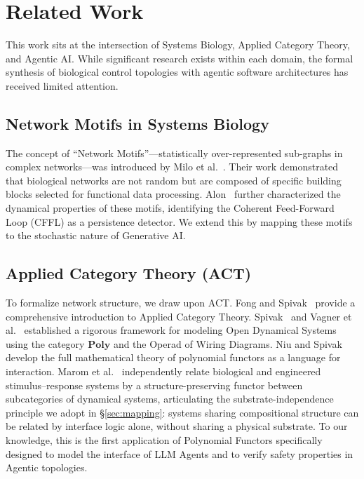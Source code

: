 \section{Related Work}

This work sits at the intersection of Systems Biology, Applied Category Theory, and Agentic AI. While significant
research exists within each domain, the formal synthesis of biological control topologies with agentic software
architectures has received limited attention.

\subsection{Network Motifs in Systems Biology}

The concept of ``Network Motifs''---statistically over-represented sub-graphs in complex networks---was introduced
by Milo et al.~\cite{milo2002network}. Their work demonstrated that biological networks are not random but are composed of specific
building blocks selected for functional data processing. Alon~\cite{alon2007network} further characterized the dynamical properties
of these motifs, identifying the Coherent Feed-Forward Loop (CFFL) as a persistence detector. We extend this by
mapping these motifs to the stochastic nature of Generative AI.

\subsection{Applied Category Theory (ACT)}

To formalize network structure, we draw upon ACT. Fong and Spivak~\cite{fong2019seven} provide a comprehensive introduction to Applied Category Theory. Spivak~\cite{spivak2021learners} and Vagner et al.~\cite{vagner2015algebras} established a rigorous framework
for modeling Open Dynamical Systems using the category $\mathbf{Poly}$ and the Operad of Wiring Diagrams. Niu and Spivak~\cite{niu2023polynomial} develop the full mathematical theory of polynomial functors as a language for interaction. Marom et al.~\cite{marom2026category} independently relate biological and engineered stimulus--response systems by a structure-preserving functor between subcategories of dynamical systems, articulating the substrate-independence principle we adopt in \S\ref{sec:mapping}: systems sharing compositional structure can be related by interface logic alone, without sharing a physical substrate. To our
knowledge, this is the first application of Polynomial Functors specifically designed to model the interface of
LLM Agents and to verify safety properties in Agentic topologies.

